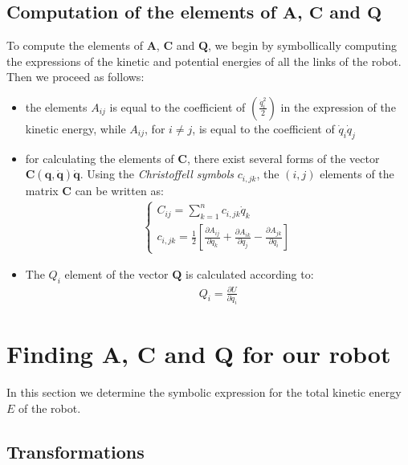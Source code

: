 \documentclass[a4paper,10pt]{article}
\begin{document}
\subsection{Computation of the elements of $\mathbf{A}$, $\mathbf{C}$ and $\mathbf{Q}$}
To compute the elements of $\mathbf{A}$, $\mathbf{C}$ and $\mathbf{Q}$, we begin by symbollically computing the 
expressions of the kinetic and potential energies of all the links of the robot. Then we proceed as follows:
 \begin{itemize}
  \item the elements $A_{ij}$ is equal to the coefficient of $\left(\frac{\dot{q}_i^2}{2}\right)$ in the expression of
  the kinetic energy, while $A_{ij}$, for $i \neq j$, is equal to the coefficient of $\dot{q}_i\dot{q}_j$
  \item for calculating the elements of $\mathbf{C}$, there exist several forms of the vector $\mathbf{C(q,\dot{q})\dot{q}}$.
 Using the \textit{Christoffell symbols} $c_{i,jk}$, the $(i,j)$ elements of the matrix $\mathbf{C}$ can be written as:
 \begin{align}
  \begin{cases}
   C_{ij} = \sum\limits^{n}_{k=1}c_{i,jk}\dot{q}_k \\
   c_{i,jk} = \frac{1}{2}\left[\frac{\partial A_{ij}}{\partial q_k} + \frac{\partial A_{ik}}{\partial q_j} - \frac{\partial A_{jk}}{\partial q_i}\right]
  \end{cases}
 \end{align}
 \item The $Q_i$ element of the vector $\mathbf{Q}$ is calculated according to:
 \begin{align}
  Q_i = \frac{\partial U}{\partial q_i}
 \end{align}
 \end{itemize}

\section{Finding $\mathbf{A}$, $\mathbf{C}$ and $\mathbf{Q}$ for our robot}
In this section we determine the symbolic expression for the  total kinetic energy $E$ of the robot.

\subsection{Transformations}
\end{document}
